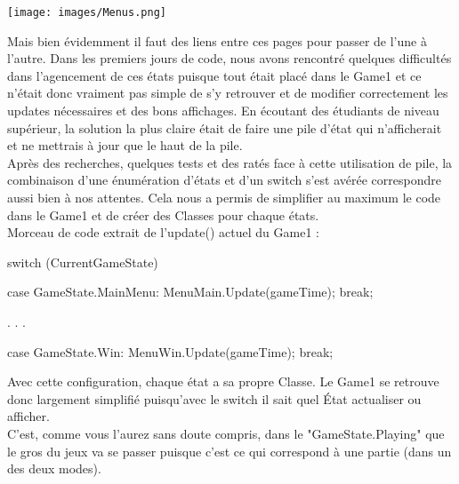 \documentclass [11pt]{report}
\begin{document}
		\vspace{4mm}
		
		\begin{center}
			\texttt{[image: images/Menus.png]}
		\end{center}
		
		
		\vspace{10mm}
			 
			 
		
		Mais bien évidemment il faut des liens entre ces pages pour passer de l'une à l'autre. Dans les premiers jours de code, nous avons rencontré quelques difficultés dans l'agencement de ces états puisque tout était placé dans le Game1 et ce n'était donc vraiment pas simple de s'y retrouver et de modifier correctement les updates nécessaires et des bons affichages. En écoutant des étudiants de niveau supérieur, la solution la plus claire était de faire une pile d'état qui n'afficherait et ne mettrais à jour que le haut de la pile.\\
		
		Après des recherches, quelques tests et des ratés face à cette utilisation de pile, la combinaison d'une énumération d'états et d'un switch s'est avérée correspondre aussi bien à nos attentes. Cela nous a permis de simplifier au maximum le code dans le Game1 et de créer des Classes pour chaque états.\\
				
		\noindent Morceau de code extrait de l'update() actuel du Game1 :
		
		
		\begin{mylisting}
	switch (CurrentGameState)
	{
		case GameState.MainMenu:
			MenuMain.Update(gameTime);
			break;
			
			.
			.
			.
			
		case GameState.Win:
			MenuWin.Update(gameTime);
			break;
	}
				\end{mylisting}
		
		\vspace{10mm}
		
		Avec cette configuration, chaque état a sa propre Classe. Le Game1 se retrouve donc largement simplifié puisqu'avec le switch il sait quel État actualiser ou afficher.\\
		
			
		C'est, comme vous l'aurez sans doute compris, dans le "GameState.Playing" que le gros du jeux va se passer puisque c'est ce qui correspond à une partie (dans un des deux modes).
		
		
		\vspace{10mm}
		\newpage
		
\end{document}
